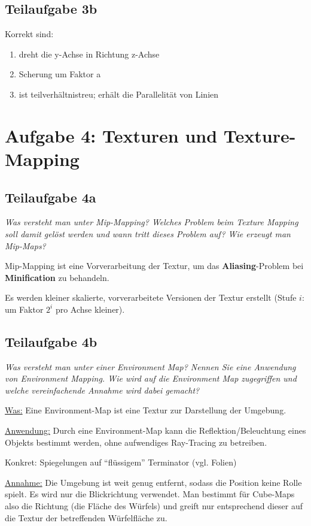 \documentclass[a4paper]{scrartcl}
\begin{document}
\clearpage
\subsection*{Teilaufgabe 3b}
Korrekt sind:
\begin{enumerate}
    \item dreht die y-Achse in Richtung z-Achse
    \item Scherung um Faktor a
    \item ist teilverhältnistreu; erhält die Parallelität von Linien
\end{enumerate}

\section*{Aufgabe 4: Texturen und Texture-Mapping}
\subsection*{Teilaufgabe 4a}
\textit{Was versteht man unter Mip-Mapping? Welches Problem beim Texture Mapping soll
damit gelöst werden und wann tritt dieses Problem auf? Wie erzeugt man Mip-Maps?}

Mip-Mapping ist eine Vorverarbeitung der Textur, um das \textbf{Aliasing}-Problem
bei \textbf{Minification} zu behandeln.

Es werden kleiner skalierte, vorverarbeitete Versionen der Textur erstellt
(Stufe $i$: um Faktor $2^i$ pro Achse kleiner).

\subsection*{Teilaufgabe 4b}
\textit{Was versteht man unter einer Environment Map? Nennen Sie eine Anwendung
von Environment Mapping. Wie wird auf die Environment Map zugegriffen und
welche vereinfachende Annahme wird dabei gemacht?}

\underline{Was:} Eine Environment-Map ist eine Textur zur Darstellung der Umgebung.

\underline{Anwendung:} Durch eine Environment-Map kann die
Reflektion/Beleuchtung eines Objekts bestimmt werden, ohne aufwendiges
Ray-Tracing zu betreiben.

Konkret: Spiegelungen auf \enquote{flüssigem} Terminator (vgl. Folien)

\underline{Annahme:} Die Umgebung ist weit genug entfernt, sodass die Position
keine Rolle spielt. Es wird nur die Blickrichtung verwendet. Man bestimmt für
Cube-Maps also die Richtung (die Fläche des Würfels) und greift nur
entsprechend dieser auf die Textur der betreffenden Würfelfläche zu.
\end{document}
